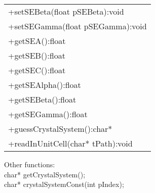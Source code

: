 \begin{table}[h]
\begin{tabular}{|l|}
+setSEBeta(float pSEBeta):void\\
+setSEGamma(float pSEGamma):void\\
+getSEA():float\\
+getSEB():float\\
+getSEC():float\\
+getSEAlpha():float\\
+getSEBeta():float\\
+getSEGamma():float\\
+guessCrystalSystem():char*\\
+readInUnitCell(char* tPath):void\\
\hline
\end{tabular}
\end{table}

Other functions:\\
char* getCrystalSystem();\\
char* crystalSystemConst(int pIndex);\\
